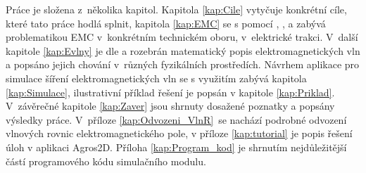 Práce je složena z~několika kapitol. Kapitola \ref{kap:Cile} vytyčuje konkrétní cíle, které tato práce hodlá splnit, kapitola \ref{kap:EMC} se s pomocí \cite{emc_trakce}, \cite{nfr}, \cite{emc_encyklopedie} a \cite{csn} zabývá problematikou EMC v~konkrétním technickém oboru, v~elektrické trakci. V~další kapitole \ref{kap:Evlny} je dle \cite{emp} a \cite{umt} rozebrán matematický popis elektromagnetických vln a popsáno jejich chování v~různých fyzikálních prostředích. Návrhem aplikace pro simulace šíření elektromagnetických vln se s využitím \cite{hpfem} zabývá kapitola \ref{kap:Simulace}, ilustrativní příklad řešení je popsán v kapitole \ref{kap:Priklad}. V~závěrečné kapitole \ref{kap:Zaver} jsou shrnuty dosažené poznatky a popsány výsledky práce. V~příloze \ref{kap:Odvozeni_VlnR}~se nachází podrobné odvození vlnových rovnic elektromagnetického pole, v příloze \ref{kap:tutorial} je popis řešení úloh v aplikaci Agros2D. Příloha \ref{kap:Program_kod} je shrnutím nejdůležitější částí programového kódu simulačního modulu.

